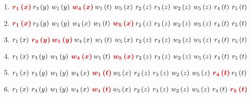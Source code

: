 \documentclass[a4paper]{article}
\begin{document}
	\begin{enumerate}
		\item $\textcolor{Red3}{\boldsymbol{r_{1}\left(x\right)} \: }r_{3}\left(y\right) \: w_{1}\left(y\right) \: \textcolor{Red3}{\boldsymbol{w_{4}\left(x\right)} \: }w_{1}\left(t\right) \: w_{5}\left(x\right) \: r_{2}\left(z\right) \: r_{3}\left(z\right) \: w_{2}\left(z\right) \: w_{5}\left(z\right) \: r_{4}\left(t\right) \: r_{5}\left(t\right)$
		
		\item $\textcolor{Red3}{\boldsymbol{r_{1}\left(x\right)} \: }r_{3}\left(y\right) \: w_{1}\left(y\right) \: w_{4}\left(x\right) \: w_{1}\left(t\right) \: \textcolor{Red3}{\boldsymbol{w_{5}\left(x\right)} \: }r_{2}\left(z\right) \: r_{3}\left(z\right) \: w_{2}\left(z\right) \: w_{5}\left(z\right) \: r_{4}\left(t\right) \: r_{5}\left(t\right)$
		
		\item $r_{1}\left(x\right) \: \textcolor{Red3}{\boldsymbol{r_{3}\left(y\right)} \: }\textcolor{Red3}{\boldsymbol{w_{1}\left(y\right)} \: }w_{4}\left(x\right) \: w_{1}\left(t\right) \: w_{5}\left(x\right) \: r_{2}\left(z\right) \: r_{3}\left(z\right) \: w_{2}\left(z\right) \: w_{5}\left(z\right) \: r_{4}\left(t\right) \: r_{5}\left(t\right)$
		
		\item $r_{1}\left(x\right) \: r_{3}\left(y\right) \: w_{1}\left(y\right) \: \textcolor{Red3}{\boldsymbol{w_{4}\left(x\right)} \: }w_{1}\left(t\right) \: \textcolor{Red3}{\boldsymbol{w_{5}\left(x\right)} \: }r_{2}\left(z\right) \: r_{3}\left(z\right) \: w_{2}\left(z\right) \: w_{5}\left(z\right) \: r_{4}\left(t\right) \: r_{5}\left(t\right)$
		
		\item $r_{1}\left(x\right) \: r_{3}\left(y\right) \: w_{1}\left(y\right) \: w_{4}\left(x\right) \: \textcolor{Red3}{\boldsymbol{w_{1}\left(t\right)} \: }w_{5}\left(x\right) \: r_{2}\left(z\right) \: r_{3}\left(z\right) \: w_{2}\left(z\right) \: w_{5}\left(z\right) \: \textcolor{Red3}{\boldsymbol{r_{4}\left(t\right)} \: }r_{5}\left(t\right)$
		
		\item $r_{1}\left(x\right) \: r_{3}\left(y\right) \: w_{1}\left(y\right) \: w_{4}\left(x\right) \: \textcolor{Red3}{\boldsymbol{w_{1}\left(t\right)} \: }w_{5}\left(x\right) \: r_{2}\left(z\right) \: r_{3}\left(z\right) \: w_{2}\left(z\right) \: w_{5}\left(z\right) \: r_{4}\left(t\right) \: \textcolor{Red3}{\boldsymbol{r_{5}\left(t\right)}}$
		

\end{enumerate}
\end{document}
